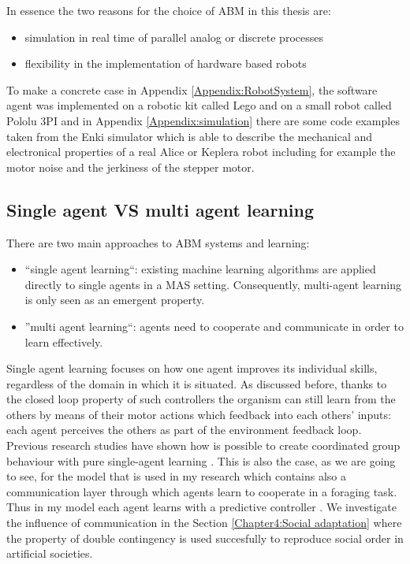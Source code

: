 In essence the two reasons for the choice of ABM in this thesis are:
\begin{itemize}
 \item simulation in real time of parallel analog or discrete processes
 \item flexibility in the implementation of hardware based robots
\end{itemize}
To make a concrete case in Appendix \ref{Appendix:RobotSystem}, the software agent 
was implemented on a robotic kit called Lego and on a small robot called Pololu 3PI 
and in Appendix \ref{Appendix:simulation} there are some code examples taken from
 the Enki simulator which is able to describe the mechanical and electronical properties
 of a real Alice or Keplera robot including for example the motor noise and the jerkiness 
of the stepper motor.



\subsection{Single agent VS multi agent learning}
There are two main approaches to ABM systems and learning:
\begin{itemize}
 \item ``single agent learning``: existing machine learning algorithms are applied
directly to single agents in a MAS setting. Consequently, multi-agent learning is only
seen as an emergent property.
\item ''multi agent learning``: agents need to cooperate and communicate in order
to learn effectively.
\end{itemize}

Single agent learning \citep{StoneVeloso98:RoboCup,Porr2006ICO,PorrNecoISO2003} 
focuses on how one agent improves
its individual skills, regardless of the domain in which it is situated.
As discussed before, thanks to the closed loop property of such controllers the 
organism can still learn from the others by means of their motor actions which 
feedback into each others' inputs: each agent perceives the others as part of the environment feedback loop.
Previous research studies have shown how is possible to create  coordinated group behaviour 
with pure single-agent learning \citep{Sugawara98learningto}.
This is also the case, as we are going to see, for the model that is used in my research which
contains also a communication layer through which agents learn to cooperate in a foraging task.
Thus in my model each agent learns with a predictive controller \citep{Porr2006ICO}.
We investigate the influence of communication in the Section \ref{Chapter4:Social adaptation} 
where the property of double contingency is used succesfully to reproduce social order
 in artificial societies.


